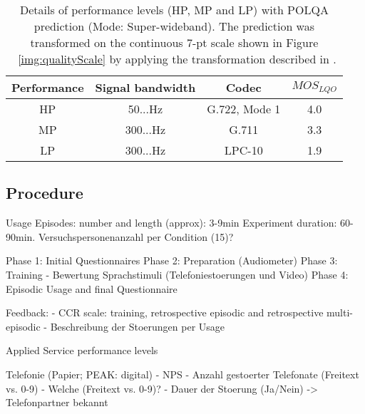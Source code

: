 \begin{table}
 \centering
 \begin{tabulary}{\columnwidth}{C|C|C|C}
   Performance & Signal bandwidth & Codec & $MOS_{LQO}$ \\
   \midrule
   \ac{HP} & 50...\unit[7000]{Hz}  & G.722, Mode 1 & 4.0 \\ %
   \hline
   \ac{MP} & 300...\unit[3400]{Hz} & G.711         & 3.3 \\ %
   \hline
   \ac{LP} & 300...\unit[3400]{Hz} & LPC-10        & 1.9 \\ %
   \end{tabulary}
   \caption{Details of performance levels (HP, MP and LP) with POLQA prediction (Mode: Super-wideband). The prediction was transformed on the continuous 7-pt scale shown in Figure ~\ref{img:qualityScale} by applying the transformation described in \cite{koster_comparison_2015}.}
   \label{tab:performance}
\end{table}






























\subsection{Procedure} %

Usage Episodes: number and length (approx): 3-9min
Experiment duration: 60-90min.
Versuchspersonenanzahl per Condition (15)?

Phase 1: Initial Questionnaires
Phase 2: Preparation (Audiometer)
Phase 3: Training - Bewertung Sprachstimuli (Telefoniestoerungen und Video)
Phase 4: Episodic Usage and final Questionnaire

Feedback:
- CCR scale: training, retrospective episodic and retrospective multi-episodic 
- Beschreibung der Stoerungen per Usage

Applied Service performance levels

Telefonie (Papier; PEAK: digital)
- NPS
- Anzahl gestoerter Telefonate (Freitext vs. 0-9)
- Welche (Freitext vs. 0-9)?
- Dauer der Stoerung (Ja/Nein)
-> Telefonpartner bekannt

